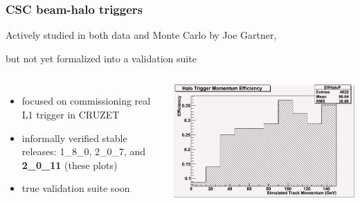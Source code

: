 \documentclass[compress]{beamer}
\begin{document}
\begin{frame}
\frametitle{CSC beam-halo triggers}
\small
Actively studied in both data and Monte Carlo by Joe Gartner,

but not yet formalized into a validation suite

\begin{columns}
\begin{itemize}
\item focused on commissioning real L1 trigger in CRUZET
\item informally verified stable releases: 1\_8\_0, 2\_0\_7, and {\bf 2\_0\_11} (these plots)
\item true validation suite soon
\end{itemize}

\vspace{0.3 cm}

\includegraphics[width=\linewidth]{HaloTriggerMomentum.png}
\end{columns}


\end{frame}
\end{document}

